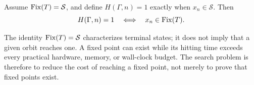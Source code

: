 \begin{proposition}
Assume $\operatorname{Fix}(T)=\mathcal S$, and define $H(\Gamma,n)=1$ exactly when $x_n\in\mathcal S$. Then
\[
H(\Gamma,n)=1
\quad\Longleftrightarrow\quad
x_n\in\operatorname{Fix}(T).
\]
\end{proposition}

\begin{caution}
The identity $\operatorname{Fix}(T)=\mathcal S$ characterizes terminal states; it does not imply that a given orbit reaches one. A fixed point can exist while its hitting time exceeds every practical hardware, memory, or wall-clock budget. The search problem is therefore to reduce the cost of reaching a fixed point, not merely to prove that fixed points exist.
\end{caution}
